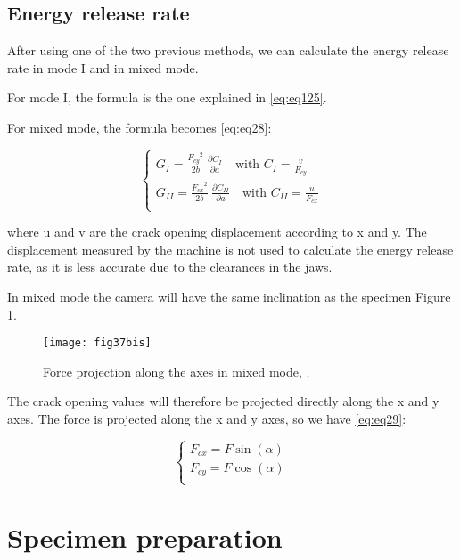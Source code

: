 \subsection{Energy release rate}

After using one of the two previous methods, we can calculate the energy release rate in mode I and in mixed mode.

For mode I, the formula is the one explained in \ref{eq:eq125}.

For mixed mode, the formula becomes \ref{eq:eq28}:

\begin{equation}
	\begin{cases}
		G_I=\frac{{F_{cy}}^2}{2b}\ \frac{\partial C_I}{\partial a} \quad \text{with } C_I=\frac{v}{F_{cy}} \\
		G_{II}=\frac{{F_{cx}}^2}{2b}\ \frac{\partial C_{II}}{\partial a} \quad \text{with } C_{II}=\frac{u}{F_{cx}}\\ 
	\end{cases}
\label{eq:eq28}
\end{equation}

where u and v are the crack opening displacement according to x and y. The displacement measured by the machine is not used to calculate the energy release rate, as it is less accurate due to the clearances in the jaws.

In mixed mode the camera will have the same inclination as the specimen Figure \ref{fig:fig37bis}.

\begin{figure}[htp]
	\centering
	\texttt{[image: fig37bis]}
	\caption{Force projection along the axes in mixed mode, \citep{Odounga2018phd}.}
	\label{fig:fig37bis}
\end{figure}

The crack opening values will therefore be projected directly along the x and y axes. The force is projected along the x and y axes, so we have \ref{eq:eq29}:


\begin{equation}
	\begin{cases}
		F_{cx}=F \sin(\alpha) \\
		F_{cy}=F \cos(\alpha) \\ 
	\end{cases}
	\label{eq:eq29}
\end{equation}


\section{Specimen preparation}

